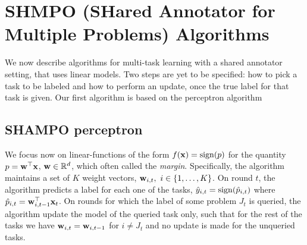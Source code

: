 \chapter{SHMPO (SHared Annotator for Multiple Problems) Algorithms}

We now describe algorithms for multi-task learning with
a shared annotator setting, that uses linear models. Two steps are
yet to be specified: how to pick a task to be labeled  and how to
perform an update, once the true label for that task is given.
Our first algorithm is based on the perceptron algorithm 

\section{SHAMPO perceptron}

We focus now on linear-functions of the form $f(\mathbf{x})={\rm sign}(p)$ for the
quantity $p={\mathbf{w}}^{\top}\mathbf{x}$, $\mathbf{w}\in\mathbb{R}^d$,  which often called the
\textit{margin}.
Specifically, the algorithm maintains a set of $K$ weight
vectors, $\mathbf{w}_{i,t},~i\in\left\{{1, \ldots , K}\right\}$. On round $t$, the algorithm predicts a label for each
 one of the tasks, $\hat{y}_{i,t}={\rm sign}(\hat{p}_{i,t})$ where $\hat{p}_{i,t}={\mathbf{w}}^{\top}_{i,t-1}\mathbf{x}_{t}$. 
 On rounds for which the label of some problem $J_t$ is queried, the algorithm update the model of the
 queried task only, such that for the rest of the tasks we have $\mathbf{w}_{i,t}=\mathbf{w}_{i,t-1}$ for $i\neq J_t$ and no
 update is made for the unqueried tasks. 


